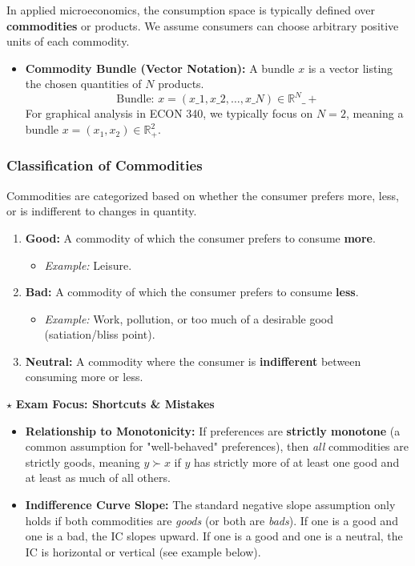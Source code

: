 \documentclass{article}
\begin{document}
In applied microeconomics, the consumption space is typically defined over \textbf{commodities} or products. We assume consumers can choose arbitrary positive units of each commodity.

\begin{itemize}
    \item \textbf{Commodity Bundle (Vector Notation):} A bundle $x$ is a vector listing the chosen quantities of $N$ products.
    $$\text{Bundle: } x = (x\_1, x\_2, \dots, x\_N) \in \mathbb{R}^N\_+$$
    For graphical analysis in ECON 340, we typically focus on $N=2$, meaning a bundle $x=(x_1, x_2) \in \mathbb{R}^2_+$.
\end{itemize}

\subsubsection*{Classification of Commodities}

Commodities are categorized based on whether the consumer prefers more, less, or is indifferent to changes in quantity.

\begin{enumerate}
    \item \textbf{Good:} A commodity of which the consumer prefers to consume \textbf{more}.
    \begin{itemize}
        \item[\circ] \textit{Example:} Leisure.
    \end{itemize}
    \item \textbf{Bad:} A commodity of which the consumer prefers to consume \textbf{less}.
    \begin{itemize}
        \item[\circ] \textit{Example:} Work, pollution, or too much of a desirable good (satiation/bliss point).
    \end{itemize}
    \item \textbf{Neutral:} A commodity where the consumer is \textbf{indifferent} between consuming more or less.
\end{enumerate}

\noindent $\star$ \textbf{Exam Focus: Shortcuts \& Mistakes}

\begin{itemize}
    \item \textbf{Relationship to Monotonicity:} If preferences are \textbf{strictly monotone} (a common assumption for "well-behaved" preferences), then \textit{all} commodities are strictly goods, meaning $y \succ x$ if $y$ has strictly more of at least one good and at least as much of all others.
    \item \textbf{Indifference Curve Slope:} The standard negative slope assumption only holds if both commodities are \textit{goods} (or both are \textit{bads}). If one is a good and one is a bad, the IC slopes upward. If one is a good and one is a neutral, the IC is horizontal or vertical (see example below).
\end{itemize}
\end{document}
